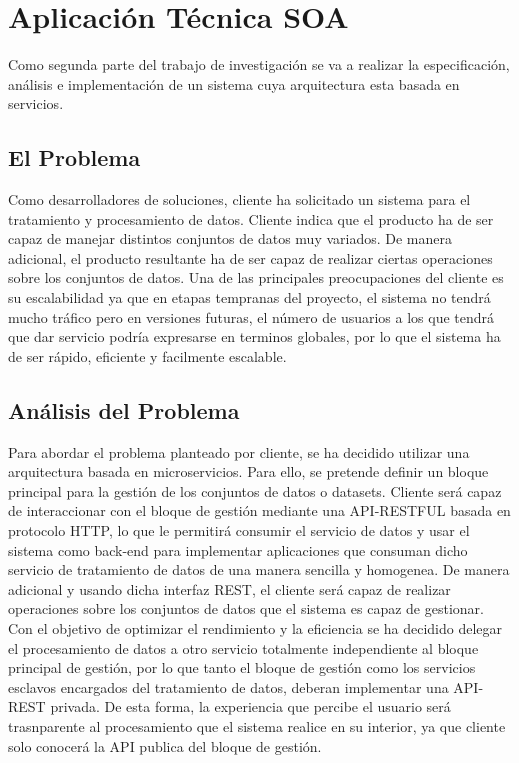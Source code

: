\documentclass[a4paper,11pt]{book}
\begin{document}
\chapter{Aplicación Técnica SOA}

Como segunda parte del trabajo de investigación se va a realizar la especificación, análisis e implementación de un sistema cuya arquitectura esta basada en servicios. 

\section{El Problema}

Como desarrolladores de soluciones, cliente ha solicitado un sistema para el tratamiento y procesamiento de datos. Cliente indica que el producto ha de ser capaz de manejar distintos conjuntos de datos muy variados. De manera adicional, el producto resultante ha de ser capaz de realizar ciertas operaciones sobre los conjuntos de datos. Una de las principales preocupaciones del cliente es su escalabilidad ya que en etapas tempranas del proyecto, el sistema no tendrá mucho tráfico pero en versiones futuras, el número de usuarios a los que tendrá que dar servicio podría expresarse en terminos globales, por lo que el sistema ha de ser rápido, eficiente y facilmente escalable.

\section{Análisis del Problema}

Para abordar el problema planteado por cliente, se ha decidido utilizar una arquitectura basada en microservicios. Para ello, se pretende definir un bloque principal para la gestión de los conjuntos de datos o datasets. Cliente será capaz de interaccionar con el bloque de gestión mediante una API-RESTFUL\cite{api} basada en protocolo HTTP\cite{http}, lo que le permitirá consumir el servicio de datos y usar el sistema como back-end para implementar aplicaciones que consuman dicho servicio de tratamiento de datos de una manera sencilla y homogenea. De manera adicional y usando dicha interfaz REST, el cliente será capaz de realizar operaciones sobre los conjuntos de datos que  el sistema es capaz de gestionar. Con el objetivo de optimizar el rendimiento y la eficiencia se ha decidido delegar el procesamiento de datos a otro servicio totalmente independiente al bloque principal de gestión, por lo que tanto el bloque de gestión como los servicios esclavos encargados del tratamiento de datos, deberan implementar una API-REST privada. De esta forma, la experiencia que percibe el usuario será trasnparente al procesamiento que el sistema realice en su interior, ya que cliente solo conocerá la API publica del bloque de gestión. 
\end{document}
